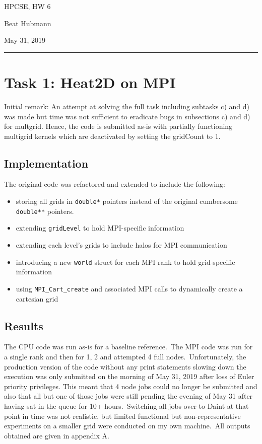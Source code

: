 \documentclass[11pt,a4paper]{article}
\begin{document}
\noindent\parbox{\linewidth}{
 \parbox{.25\linewidth}{\large HPCSE, HW 6}\hfill
 \parbox{.5\linewidth}{\begin{center} \large Beat Hubmann \end{center}}\hfill
 \parbox{.2\linewidth}{\begin{flushright} \large May 31, 2019 \end{flushright}}
}
\noindent\rule{\linewidth}{2pt}

\section{Task 1: Heat2D on MPI}

Initial remark: An attempt at solving the full task including subtasks c) and d) was made but
time was not sufficient to eradicate bugs in subsections c) and d) for multgrid. Hence,
the code is submitted as-is with partially functioning multigrid kernels which are
deactivated by setting the gridCount to 1.
\\

\subsection{Implementation}
The original code was refactored and extended to include the following:
\begin{itemize}
	\item storing all grids in \texttt{double*} pointers instead of the original cumbersome \texttt{double**} pointers.
	\item extending \texttt{gridLevel} to hold MPI-specific information
	\item extending each level's grids to include halos for MPI communication
	\item introducing a new \texttt{world} struct for each MPI rank to hold grid-specific information
	\item using \texttt{MPI\_Cart\_create} and associated MPI calls to dynamically create a cartesian grid
\end{itemize}

\subsection{Results}
The CPU code was run as-is for a baseline reference.\
The MPI code was run for a single rank and then for 1, 2 and attempted 4 full nodes.\
Unfortunately, the production version of the code without any print statements slowing
down the execution was only submitted on the morning of May 31, 2019 after loss
of Euler priority privileges. This meant that 4 node jobs could no longer be submitted and also
that all but one of those jobs were still pending the evening of May 31 after having sat 
in the queue for 10+ hours.\
Switching all jobs over to Daint at that point in time was not realistic, but 
limited functional but non-representative experiments on a smaller grid were conducted on my own machine.\
All outputs obtained are given in appendix A.
\end{document}
